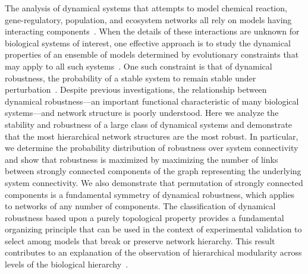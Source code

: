 The analysis of dynamical systems that attempts to model chemical reaction, gene-regulatory, population, and ecosystem networks all rely on models having interacting components~\cite{RossCr2003,Alon2006,Palsson2006,HamidBolouri2008,Palsson2011a,Voit2012,Sauro2012}. When the details of these interactions are unknown for biological systems of interest, one effective approach is to study the dynamical properties of an ensemble of models determined by evolutionary constraints that may apply to all such systems~\cite{Gardner1970,May1972,Cohen1984,May1972a,Radius2014}. One such constraint is that of dynamical robustness, the probability of a stable system to remain stable under perturbation~\cite{WADDINGTON1942a,Wagner1997,Rutherford1998,VanNimwegen1999,Siegal2002,Bergman2003,Ciliberti2007b,Ciliberti2007,Draghi2010,Wagner2013}. Despite previous investigations, the relationship between dynamical robustness---an important functional characteristic of many biological systems---and network structure is poorly understood. Here we analyze the stability and robustness of a large class of dynamical systems and demonstrate that the most hierarchical network structures are the most robust. In particular, we determine the probability distribution of robustness over system connectivity and show that robustness is maximized by maximizing the number of links between strongly connected components of the graph representing the underlying system connectivity. We also demonstrate that permutation of strongly connected components is a fundamental symmetry of dynamical robustness, which applies to networks of any number of components.  The classification of dynamical robustness based upon a purely topological property provides a fundamental organizing principle that can be used in the context of experimental validation to select among models that break or preserve network hierarchy. This result contributes to an explanation of the observation of hierarchical modularity across levels of the biological hierarchy~\cite{Zhao2006,Ravasz2002,Bhardwaj2010,Colm,Corominas-Murtra2013}.
